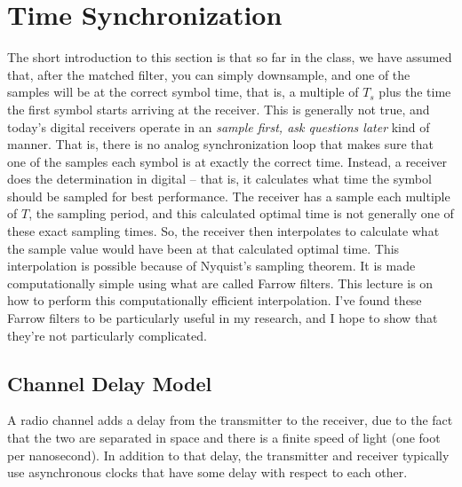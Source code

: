 




\section{Time Synchronization}

The short introduction to this section is that so far in the class, we have assumed that, after the matched filter, you can simply downsample, and one of the samples will be at the correct symbol time, that is, a multiple of $T_s$ plus the time the first symbol starts arriving at the receiver.  This is generally not true, and today's digital receivers operate in an \textit{sample first, ask questions later} kind of manner.  That is, there is no analog synchronization loop that makes sure that one of the samples each symbol is at exactly the correct time.  Instead, a receiver does the determination in digital -- that is, it calculates what time the symbol should be sampled for best performance.  The receiver has a sample each multiple of $T$, the sampling period, and this calculated optimal time is not generally one of these exact sampling times.  So, the receiver then interpolates to calculate what the sample value would have been at that calculated optimal time.   This interpolation is possible because of Nyquist's sampling theorem.  It is made computationally simple using what are called Farrow filters.  This lecture is on how to perform this computationally efficient interpolation.  I've found these Farrow filters to be particularly useful in my research, and I hope to show that they're not particularly complicated.

\subsection{Channel Delay Model}

A radio channel adds a delay from the transmitter to the receiver, due to the fact that the two are separated in space and there is a finite speed of light (one foot per nanosecond).  In addition to that delay, the transmitter and receiver typically use asynchronous clocks that have some delay with respect to each other.

